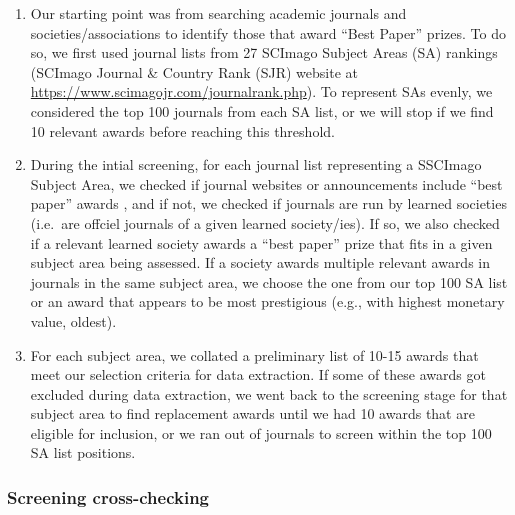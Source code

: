 \documentclass[
]{article}
\begin{document}
\begin{enumerate}
\def\labelenumi{\arabic{enumi}.}
\item
  Our starting point was from searching academic journals and
  societies/associations to identify those that award ``Best Paper''
  prizes. To do so, we first used journal lists from 27 SCImago Subject
  Areas (SA) rankings (SCImago Journal \& Country Rank (SJR) website at
  \url{https://www.scimagojr.com/journalrank.php}). To represent SAs
  evenly, we considered the top 100 journals from each SA list, or we
  will stop if we find 10 relevant awards before reaching this
  threshold.
\item
  During the intial screening, for each journal list representing a
  SSCImago Subject Area, we checked if journal websites or announcements
  include ``best paper'' awards , and if not, we checked if journals are
  run by learned societies (i.e.~are offciel journals of a given learned
  society/ies). If so, we also checked if a relevant learned society
  awards a ``best paper'' prize that fits in a given subject area being
  assessed. If a society awards multiple relevant awards in journals in
  the same subject area, we choose the one from our top 100 SA list or
  an award that appears to be most prestigious (e.g., with highest
  monetary value, oldest).
\item
  For each subject area, we collated a preliminary list of 10-15 awards
  that meet our selection criteria for data extraction. If some of these
  awards got excluded during data extraction, we went back to the
  screening stage for that subject area to find replacement awards until
  we had 10 awards that are eligible for inclusion, or we ran out of
  journals to screen within the top 100 SA list positions.
\end{enumerate}

\hypertarget{screening-cross-checking}{%
\subsubsection{Screening
cross-checking}\label{screening-cross-checking}}
\end{document}
